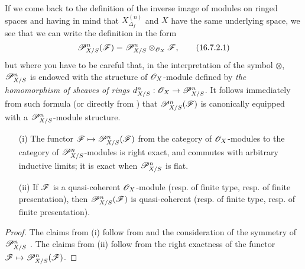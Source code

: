 \begin{env}[16.7.2]
\label{IV.16.7.2}
If we come back to the definition of the inverse image of modules on ringed spaces  and having in mind that $X_{\Delta_f}^{(n)}$ and $X$ have the same underlying space, we see that we can write the definition  in the form
\[
  \label{IV.16.7.2.1}
  \mathscr{P}_{X/S}^n(\mathscr{F}) = \mathscr{P}_{X/S}^n \otimes_{\mathscr{O}_X} \mathscr{F},
  \tag{16.7.2.1}
\]
but where you have to be careful that, in the interpretation of the symbol $\otimes$, $\mathscr{P}_{X/S}^n$ is endowed with the structure of $\mathscr{O}_X$-module defined by \emph{the homomorphism of sheaves of rings $d_{X/S}^n:\sh{O}_X \to \sh{P}_{X/S}^n$}.
It follows immediately from such formula (or directly from ) that $\mathscr{P}_{X/S}^n(\mathscr{F})$ is canonically equipped with a $\mathscr{P}_{X/S}^n$-module structure. 
\end{env}

\begin{proposition}[16.7.3]
\label{IV.16.7.3}
\begin{enumerate}
  \item[\rm{(i)}] The functor $\sh{F} \mapsto \sh{P}_{X/S}^n(\sh{F})$ from the category of $\mathscr{O}_X$-modules to the category of $\mathscr{P}_{X/S}^n$-modules is right exact, and commutes with arbitrary inductive limits;
  it is exact when $\mathscr{P}_{X/S}^n$ is flat.
  \item[\rm{(ii)}] If $\mathscr{F}$ is a quasi-coherent $\mathscr{O}_X$-module (resp. of finite type, resp. of finite presentation), then $\mathscr{P}_{X/S}^n(\mathscr{F})$ is quasi-coherent (resp. of finite type, resp. of finite presentation).
\end{enumerate}
\end{proposition}

\begin{proof}
The claims from \rm{(i)} follow from  and the consideration of the symmetry of $\mathscr{P}_{X/S}^n$ .
The claims from \rm{(ii)} follow from the right exactness of the functor $\sh{F} \mapsto \sh{P}_{X/S}^n(\sh{F})$.
\end{proof}

